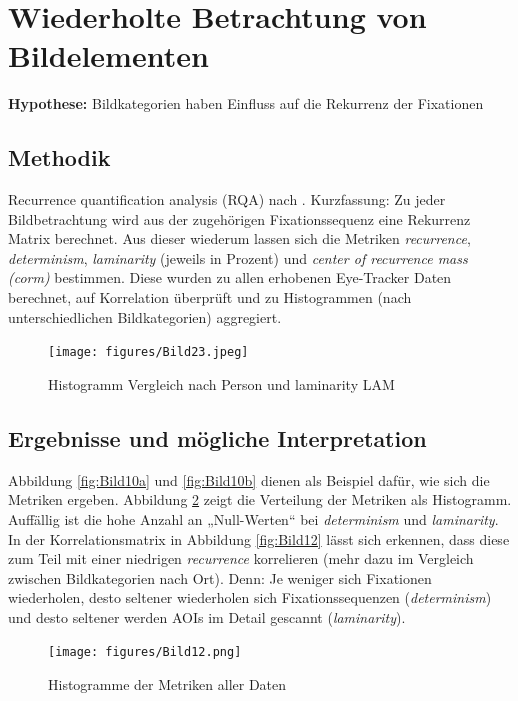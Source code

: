 \documentclass[
    language=german, %
    thesis=seminar, %
    supervisor=postdoc, %
    multiauthor=true, %
    ]{settings/csssa-thesis}
\begin{document}
\section{Wiederholte Betrachtung von Bildelementen}

\textbf{Hypothese:} Bildkategorien haben Einfluss auf die Rekurrenz der Fixationen 

\subsection{Methodik}
Recurrence quantification analysis (RQA) nach \citeauthor{Anderson2013-oj}. 
Kurzfassung: Zu jeder Bildbetrachtung wird aus der zugehörigen Fixationssequenz 
eine Rekurrenz Matrix berechnet. Aus dieser wiederum lassen sich die Metriken \textit{recurrence}, 
\textit{determinism}, \textit{laminarity} (jeweils in Prozent) und \textit{center of recurrence mass (corm)} bestimmen. 
Diese wurden zu allen erhobenen Eye-Tracker Daten berechnet, auf Korrelation überprüft 
und zu Histogrammen (nach unterschiedlichen Bildkategorien) aggregiert.

\begin{figure}[h]
    \centering
    \texttt{[image: figures/Bild23.jpeg]}
    \caption{Histogramm Vergleich nach Person und laminarity LAM}\label{fig:bild19}
\end{figure}

\subsection{Ergebnisse und mögliche Interpretation}
Abbildung \ref{fig:Bild10a} und \ref{fig:Bild10b} dienen als Beispiel dafür, wie sich die Metriken ergeben. 
Abbildung \ref{fig:Bild11} zeigt die Verteilung der Metriken als Histogramm. Auffällig ist 
die hohe Anzahl an „Null-Werten“ bei \textit{determinism} und \textit{laminarity}. 
In der Korrelationsmatrix in Abbildung \ref{fig:Bild12} lässt sich erkennen, dass diese zum 
Teil mit einer niedrigen \textit{recurrence} korrelieren (mehr dazu im Vergleich zwischen Bildkategorien nach Ort). 
Denn: Je weniger sich Fixationen wiederholen, desto seltener wiederholen sich 
Fixationssequenzen (\textit{determinism}) und desto seltener werden AOIs im Detail gescannt (\textit{laminarity}). 

\begin{figure}[ht]
    \centering
    \texttt{[image: figures/Bild12.png]}
    \caption{Histogramme der Metriken aller Daten}\label{fig:Bild11}
\end{figure}
\end{document}
